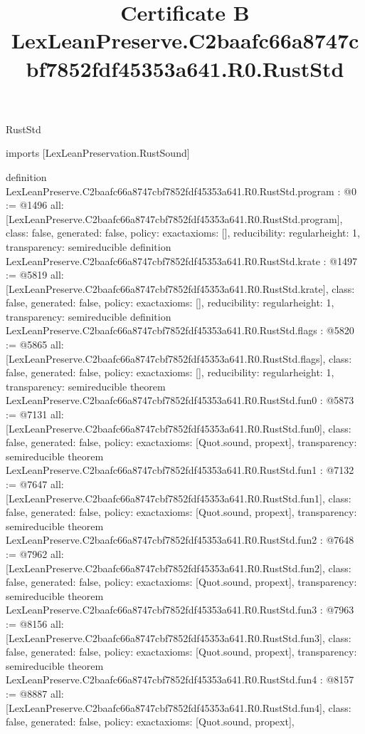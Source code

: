 \begin{lexlean}{RustStd}
\title{Certificate B LexLeanPreserve.C2baafc66a8747cbf7852fdf45353a641.R0.RustStd}
\begin{coremodule}
imports [LexLeanPreservation.RustSound]

definition LexLeanPreserve.C2baafc66a8747cbf7852fdf45353a641.R0.RustStd.program : @0 := @1496 {
  all: [LexLeanPreserve.C2baafc66a8747cbf7852fdf45353a641.R0.RustStd.program],
  class: false,
  generated: false,
  policy: exact{axioms: []},
  reducibility: regular{height: 1},
  transparency: semireducible
}
definition LexLeanPreserve.C2baafc66a8747cbf7852fdf45353a641.R0.RustStd.krate : @1497 := @5819 {
  all: [LexLeanPreserve.C2baafc66a8747cbf7852fdf45353a641.R0.RustStd.krate],
  class: false,
  generated: false,
  policy: exact{axioms: []},
  reducibility: regular{height: 1},
  transparency: semireducible
}
definition LexLeanPreserve.C2baafc66a8747cbf7852fdf45353a641.R0.RustStd.flags : @5820 := @5865 {
  all: [LexLeanPreserve.C2baafc66a8747cbf7852fdf45353a641.R0.RustStd.flags],
  class: false,
  generated: false,
  policy: exact{axioms: []},
  reducibility: regular{height: 1},
  transparency: semireducible
}
theorem LexLeanPreserve.C2baafc66a8747cbf7852fdf45353a641.R0.RustStd.fun0 : @5873 := @7131 {
  all: [LexLeanPreserve.C2baafc66a8747cbf7852fdf45353a641.R0.RustStd.fun0],
  class: false,
  generated: false,
  policy: exact{axioms: [Quot.sound, propext]},
  transparency: semireducible
}
theorem LexLeanPreserve.C2baafc66a8747cbf7852fdf45353a641.R0.RustStd.fun1 : @7132 := @7647 {
  all: [LexLeanPreserve.C2baafc66a8747cbf7852fdf45353a641.R0.RustStd.fun1],
  class: false,
  generated: false,
  policy: exact{axioms: [Quot.sound, propext]},
  transparency: semireducible
}
theorem LexLeanPreserve.C2baafc66a8747cbf7852fdf45353a641.R0.RustStd.fun2 : @7648 := @7962 {
  all: [LexLeanPreserve.C2baafc66a8747cbf7852fdf45353a641.R0.RustStd.fun2],
  class: false,
  generated: false,
  policy: exact{axioms: [Quot.sound, propext]},
  transparency: semireducible
}
theorem LexLeanPreserve.C2baafc66a8747cbf7852fdf45353a641.R0.RustStd.fun3 : @7963 := @8156 {
  all: [LexLeanPreserve.C2baafc66a8747cbf7852fdf45353a641.R0.RustStd.fun3],
  class: false,
  generated: false,
  policy: exact{axioms: [Quot.sound, propext]},
  transparency: semireducible
}
theorem LexLeanPreserve.C2baafc66a8747cbf7852fdf45353a641.R0.RustStd.fun4 : @8157 := @8887 {
  all: [LexLeanPreserve.C2baafc66a8747cbf7852fdf45353a641.R0.RustStd.fun4],
  class: false,
  generated: false,
  policy: exact{axioms: [Quot.sound, propext]},
}
\end{coremodule}
\end{lexlean}
